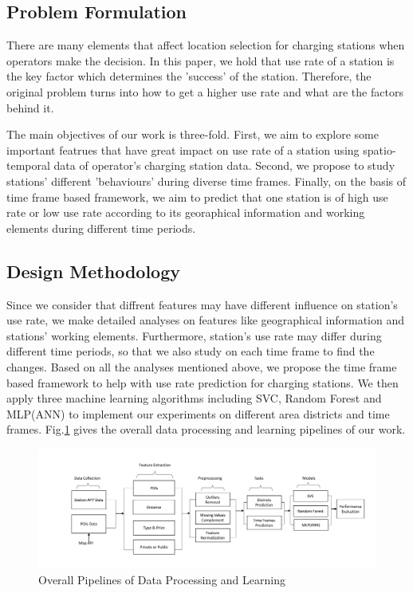 \subsection{Problem Formulation}
There are many elements that affect location selection for charging stations when operators make the decision. In this paper, we hold that use rate of a station is the key factor which determines the 'success' of the station. Therefore, the original problem turns into how to get a higher use rate and what are the factors behind it. 

The main objectives of our work is three-fold. First, we aim to explore some important featrues that have great impact on use rate of a station using spatio-temporal data of operator's charging station data. Second, we propose to study stations' different 'behaviours' during diverse time frames. Finally, on the basis of time frame based framework, we aim to predict that one station is of high use rate or low use rate according to its georaphical information and working elements during different time periods.

\subsection{Design Methodology}
Since we consider that diffrent features may have different influence on station's use rate, we make detailed analyses on features like geographical information and stations' working elements. Furthermore, station's use rate may differ during different time periods, so that we also study on each time frame to find the changes. Based on all the analyses mentioned above, we propose the time frame based framework to help with use rate prediction for charging stations. We then apply three machine learning algorithms including SVC, Random Forest and MLP(ANN) to implement our experiments on different area districts and time frames. Fig.\ref{fig2} gives the overall data processing and learning pipelines of our work.

\begin{figure}[!htp]
	\includegraphics[width=2\columnwidth]{./figures/pipeline.pdf}
	\centering
	\caption{Overall Pipelines of Data Processing and Learning}
	\label{fig2}
\end{figure}

